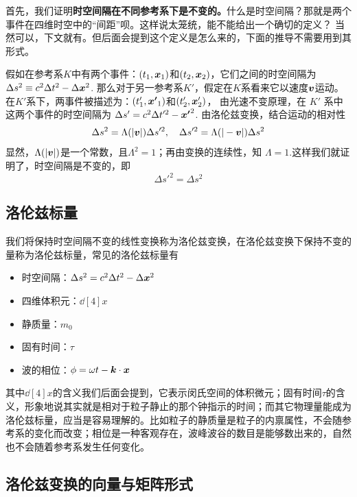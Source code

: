 \documentclass[12pt, a4paper, oneside]{ctexbook}
\begin{document}
首先，我们证明\textbf{时空间隔在不同参考系下是不变的。}什么是时空间隔？那就是两个事件在四维时空中的“间距”呗。这样说太笼统，能不能给出一个确切的定义？
当然可以，下文就有。但后面会提到这个定义是怎么来的，下面的推导不需要用到其形式。\par   

假如在参考系$K$中有两个事件：$(t_{1},\vb*{x}_{1})$和$(t_{2},\vb*{x}_{2})$，它们之间的时空间隔为 $\Delta s^{2}\equiv c^{2}\Delta t^{2}-\Delta\vb*{x}^{2}$.
那么对于另一参考系$K'$，假定在$K$系看来它以速度$\vb*{v}$运动。
在$K'$系下，两事件被描述为：$(t_{1}',\vb*{x'}_{1})$和$(t'_{2},\vb*{x}'_{2})$，
由光速不变原理，在 $K'$ 系中这两个事件的时空间隔为 $\Delta s'=c^{2}\Delta t'^{2}-\vb*{x'}^{2}$. 由洛伦兹变换，结合运动的相对性
\begin{equation}
	\Delta s^{2}=\Lambda(|\vb*{v}|)\Delta s'^{2},\quad \Delta s'^{2}=\Lambda(|-\vb*{v}|)\Delta s^{2}
\end{equation}
显然，$\Lambda(|\vb*{v}|)$是一个常数，且$\Lambda^{2}=1$；再由变换的连续性，知 $\Lambda=1$.这样我们就证明了，时空间隔是不变的，即
\begin{equation}
	\Delta s'^{2}=\Delta s^{2}
\end{equation}

\subsection{洛伦兹标量}

我们将保持时空间隔不变的线性变换称为洛伦兹变换，在洛伦兹变换下保持不变的量称为洛伦兹标量，常见的洛伦兹标量有
\begin{itemize}
	\item 时空间隔：$\Delta s^{2}=c^{2}\Delta t^{2}-\Delta\vb*{x}^{2}$
	\item 四维体积元：$\dd[4]{x}$
	\item 静质量：$m_{0}$
	\item 固有时间：$\tau$
	\item 波的相位：$\phi=\omega t-\vb*{k}\cdot\vb*{x}$
\end{itemize}
其中$\dd[4]{x}$的含义我们后面会提到，它表示闵氏空间的体积微元；固有时间$\tau$的含义，形象地说其实就是相对于粒子静止的那个钟指示的时间；而其它物理量能成为洛伦兹标量，应当是容易理解的。比如粒子的静质量是粒子的内禀属性，不会随参考系的变化而改变；相位是一种客观存在，波峰波谷的数目是能够数出来的，自然也不会随着参考系发生任何变化。\par 

\subsection{洛伦兹变换的向量与矩阵形式}
\end{document}
